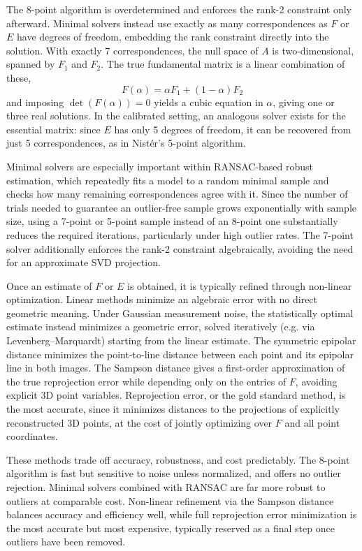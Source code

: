 The 8-point algorithm is overdetermined and enforces the rank-2 constraint only afterward. Minimal solvers instead use exactly as many correspondences as $F$ or $E$ have degrees of freedom, embedding the rank constraint directly into the solution. With exactly 7 correspondences, the null space of $A$ is two-dimensional, spanned by $F_1$ and $F_2$. The true fundamental matrix is a linear combination of these,
\begin{equation}
    F(\alpha) = \alpha F_1 + (1-\alpha) F_2
\end{equation}
and imposing $\det(F(\alpha)) = 0$ yields a cubic equation in $\alpha$, giving one or three real solutions. In the calibrated setting, an analogous solver exists for the essential matrix: since $E$ has only 5 degrees of freedom, it can be recovered from just 5 correspondences, as in Nist\'er's 5-point algorithm.

Minimal solvers are especially important within RANSAC-based robust estimation, which repeatedly fits a model to a random minimal sample and checks how many remaining correspondences agree with it. Since the number of trials needed to guarantee an outlier-free sample grows exponentially with sample size, using a 7-point or 5-point sample instead of an 8-point one substantially reduces the required iterations, particularly under high outlier rates. The 7-point solver additionally enforces the rank-2 constraint algebraically, avoiding the need for an approximate SVD projection.

Once an estimate of $F$ or $E$ is obtained, it is typically refined through non-linear optimization. Linear methods minimize an algebraic error with no direct geometric meaning. Under Gaussian measurement noise, the statistically optimal estimate instead minimizes a geometric error, solved iteratively (e.g. via Levenberg--Marquardt) starting from the linear estimate. The symmetric epipolar distance minimizes the point-to-line distance between each point and its epipolar line in both images. The Sampson distance gives a first-order approximation of the true reprojection error while depending only on the entries of $F$, avoiding explicit 3D point variables. Reprojection error, or the gold standard method, is the most accurate, since it minimizes distances to the projections of explicitly reconstructed 3D points, at the cost of jointly optimizing over $F$ and all point coordinates.

These methods trade off accuracy, robustness, and cost predictably. The 8-point algorithm is fast but sensitive to noise unless normalized, and offers no outlier rejection. Minimal solvers combined with RANSAC are far more robust to outliers at comparable cost. Non-linear refinement via the Sampson distance balances accuracy and efficiency well, while full reprojection error minimization is the most accurate but most expensive, typically reserved as a final step once outliers have been removed.